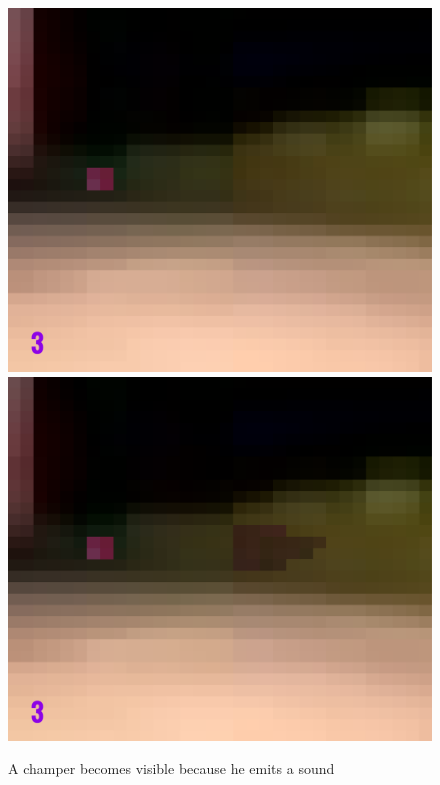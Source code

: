 \begin{figure}[h]
  \centering
  \includegraphics[width=1\textwidth, height=1\textwidth]{images/game_systems/ChamperInvisible.png}
  \includegraphics[width=1\textwidth, height=1\textwidth]{images/game_systems/ChamperVisible.png}
  \caption{A champer becomes visible because he emits a sound}
  \label{Champer}
\end{figure}


